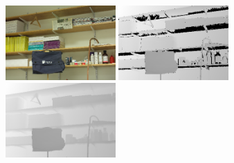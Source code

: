 \begin{figure}[htb]
\begin{minipage}[b]{0.3\linewidth}
\end{minipage}
\vfill
\begin{minipage}[b]{0.3\linewidth}
  \centering
  \centerline{\includegraphics[width=4.2cm]{depth_interp/quali_rst/img_Shelves-perfect.png}}
\end{minipage}
%
\hfill
\begin{minipage}[b]{0.3\linewidth}
  \centering
  \centerline{\includegraphics[width=4.2cm]{depth_interp/quali_rst/n_hf_Shelves-perfect.png}}
\end{minipage}
\hfill
\begin{minipage}[b]{0.3\linewidth}
  \centering
  \centerline{\includegraphics[width=4.2cm]{depth_interp/quali_rst/hf_Shelves-perfect.png}}

\end{minipage}
\end{figure}
